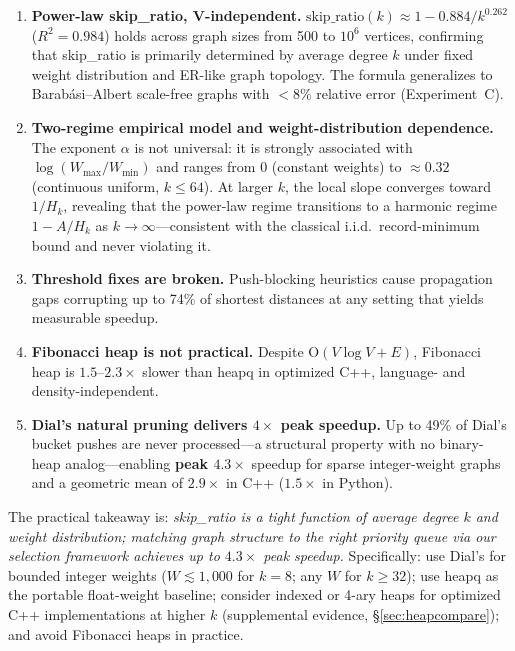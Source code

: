 \documentclass[conference]{IEEEtran}
\begin{document}
\begin{enumerate}
  \item \textbf{Power-law skip\_ratio, V-independent.}
        $\text{skip\_ratio}(k)\approx 1-0.884/k^{0.262}$ ($R^2=0.984$)
        holds across graph sizes from 500 to $10^6$ vertices, confirming
        that skip\_ratio is primarily determined by average degree $k$
        under fixed weight distribution and ER-like graph topology.
        The formula generalizes to Barab\'{a}si--Albert scale-free graphs
        with $<8\%$ relative error (Experiment~C).
  \item \textbf{Two-regime empirical model and weight-distribution dependence.}
        The exponent $\alpha$ is not universal: it is strongly associated with
        $\log(W_{\max}/W_{\min})$ and ranges from $0$ (constant weights)
        to ${\approx}0.32$ (continuous uniform, $k\leq 64$).
        At larger $k$, the local slope converges toward $1/H_k$,
        revealing that the power-law regime transitions to a harmonic
        regime $1-A/H_k$ as $k\to\infty$---consistent with the
        classical i.i.d.\ record-minimum bound and never violating it.
  \item \textbf{Threshold fixes are broken.}
        Push-blocking heuristics cause propagation gaps corrupting up to
        74\% of shortest distances at any setting that yields measurable
        speedup.
  \item \textbf{Fibonacci heap is not practical.}
        Despite O$(V\log V + E)$, Fibonacci heap is $1.5$--$2.3\times$
        slower than heapq in optimized C++, language- and
        density-independent.
  \item \textbf{Dial's natural pruning delivers $4\times$ peak speedup.}
        Up to 49\% of Dial's bucket pushes are never processed---a
        structural property with no binary-heap analog---enabling
        \textbf{peak $4.3\times$} speedup for sparse integer-weight graphs
        and a geometric mean of $2.9\times$ in C++ ($1.5\times$ in Python).
\end{enumerate}

The practical takeaway is:
\emph{skip\_ratio is a tight function of average degree $k$ and weight
distribution; matching graph structure to the right priority queue via
our selection framework achieves up to $4.3\times$ peak speedup.}
Specifically: use Dial's for bounded integer weights ($W \lesssim 1{,}000$
for $k{=}8$; any $W$ for $k{\geq}32$); use heapq as the portable
float-weight baseline; consider indexed or 4-ary heaps for optimized
C++ implementations at higher $k$ (supplemental evidence, §\ref{sec:heapcompare});
and avoid Fibonacci heaps in practice.
\end{document}
